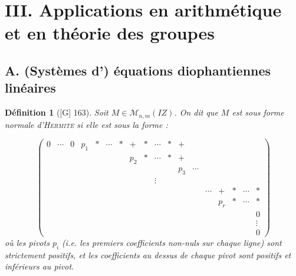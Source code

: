 \documentclass[10pt, a4paper, parskip=full, twoside, twocolumn]{report}
\newtheorem{definition}{Définition}
\begin{document}
\section*{III. Applications en arithmétique et en théorie des groupes}
\subsection*{A. (Systèmes d') équations diophantiennes linéaires}

\begin{definition}[\textnormal{[G] 163}]
	Soit $M\in \mathcal{M}_{n,m}(IZ)$. On dit que $M$ est sous \emph{forme normale d'\textsc{Hermite}}
	si elle est sous la forme :

	$$\left(\begin{smallmatrix}
			0 & \cdots & 0 & p_1 & * & \cdots & * & + & * & \cdots & * & + & & & & & & \\
			& & & & & & & p_2 & * & \cdots & * & + & & & & & & \\
			& & & & & & & & & & & p_3 & \cdots & & & & & \\
			& & & & & & & & & \vdots & & & & & & & & \\
			& & & & & & & & & & & & & \cdots & + & * & \cdots & * \\
			& & & & & & & & & & & & & & p_r & * & \cdots & * \\
			& & & & & & & & & & & & & & & & & 0 \\
			& & & & & & & & & & & & & & & & & \vdots \\
			& & & & & & & & & & & & & & & & & 0
		\end{smallmatrix}\right)$$
	où les pivots $p_i$ (\emph{i.e.} les premiers coefficients non-nuls sur chaque ligne) sont strictement positifs, et les coefficients au dessus de 
	chaque pivot sont positifs et inférieurs au pivot.
\end{definition}
\end{document}
